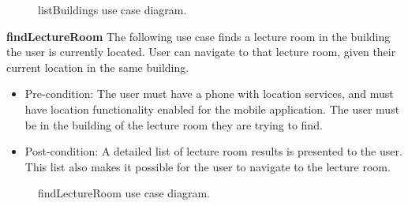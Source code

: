 \documentclass[12pt,a4paper]{article}
\begin{document}
			\begin{figure}[ht!]
				\caption \newline listBuildings use case diagram.
			\end{figure}

			\textbf{findLectureRoom}
			The following use case finds a lecture room in the building the user is currently located. User can navigate to 				that lecture room, given their current location in the same building.

			\begin{itemize}
			\item Pre-condition: The user must have a phone with location services, and must have location functionality 						  enabled for the mobile application. The user must be in the building of the lecture room they are trying 						  to find.
			\item Post-condition: A detailed list of lecture room results is presented to the user. This list also makes it 					  possible for the user to navigate to the lecture room.
			\end{itemize}

			\begin{figure}[ht!]
				\caption \newline findLectureRoom use case diagram.
			\end{figure}
\end{document}

